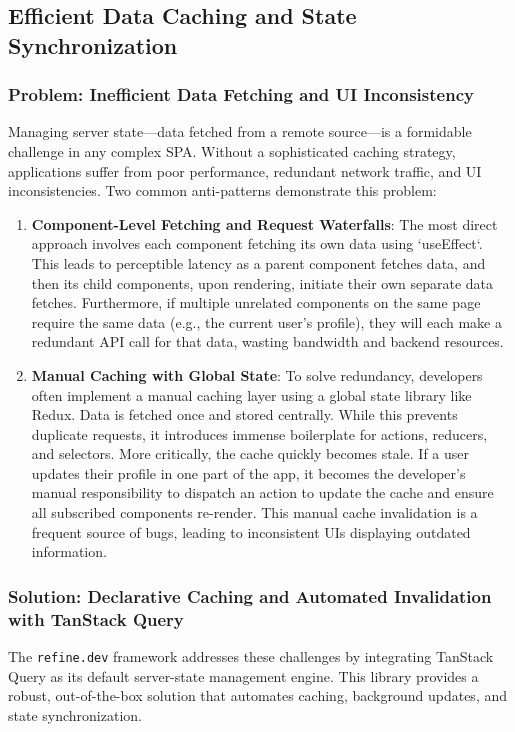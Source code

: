 \subsection{Efficient Data Caching and State Synchronization}
\label{subsec:efficient_caching}

\subsubsection{Problem: Inefficient Data Fetching and UI Inconsistency}
Managing server state—data fetched from a remote source—is a formidable challenge in any complex SPA. Without a sophisticated caching strategy, applications suffer from poor performance, redundant network traffic, and UI inconsistencies. Two common anti-patterns demonstrate this problem:

\begin{enumerate}
    \item \textbf{Component-Level Fetching and Request Waterfalls}: The most direct approach involves each component fetching its own data using `useEffect`. This leads to perceptible latency as a parent component fetches data, and then its child components, upon rendering, initiate their own separate data fetches. Furthermore, if multiple unrelated components on the same page require the same data (e.g., the current user's profile), they will each make a redundant API call for that data, wasting bandwidth and backend resources.
    \item \textbf{Manual Caching with Global State}: To solve redundancy, developers often implement a manual caching layer using a global state library like Redux. Data is fetched once and stored centrally. While this prevents duplicate requests, it introduces immense boilerplate for actions, reducers, and selectors. More critically, the cache quickly becomes stale. If a user updates their profile in one part of the app, it becomes the developer's manual responsibility to dispatch an action to update the cache and ensure all subscribed components re-render. This manual cache invalidation is a frequent source of bugs, leading to inconsistent UIs displaying outdated information.
\end{enumerate}

\subsubsection{Solution: Declarative Caching and Automated Invalidation with TanStack Query}
The \texttt{refine.dev} framework addresses these challenges by integrating TanStack Query as its default server-state management engine. This library provides a robust, out-of-the-box solution that automates caching, background updates, and state synchronization.

